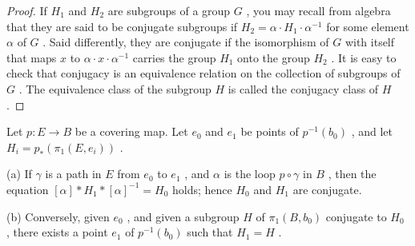 \begin{proof}
If \({H}_{1}\) and \({H}_{2}\) are subgroups of a group \(G\) , you may recall from algebra that they are said to be conjugate subgroups if \({H}_{2} = \alpha  \cdot  {H}_{1} \cdot  {\alpha }^{-1}\) for some element \(\alpha\) of \(G\) . Said differently, they are conjugate if the isomorphism of \(G\) with itself that maps \(x\) to \(\alpha  \cdot  x \cdot  {\alpha }^{-1}\) carries the group \({H}_{1}\) onto the group \({H}_{2}\) . It is easy to check that conjugacy is an equivalence relation on the collection of subgroups of \(G\) . The equivalence class of the subgroup \(H\) is called the conjugacy class of \(H\) .
\end{proof}
\begin{lemma} Let \(p : E \rightarrow  B\) be a covering map. Let \({e}_{0}\) and \({e}_{1}\) be points of \({p}^{-1}\left( {b}_{0}\right)\) , and let \({H}_{i} = {p}_{ * }\left( {{\pi }_{1}\left( {E,{e}_{i}}\right) }\right)\) .
\end{lemma}

(a) If \(\gamma\) is a path in \(E\) from \({e}_{0}\) to \({e}_{1}\) , and \(\alpha\) is the loop \(p \circ  \gamma\) in \(B\) , then the equation \(\left\lbrack  \alpha \right\rbrack * {H}_{1} * {\left\lbrack  \alpha \right\rbrack  }^{-1} = {H}_{0}\) holds; hence \({H}_{0}\) and \({H}_{1}\) are conjugate.

(b) Conversely, given \({e}_{0}\) , and given a subgroup \(H\) of \({\pi }_{1}\left( {B,{b}_{0}}\right)\) conjugate to \({H}_{0}\) , there exists a point \({e}_{1}\) of \({p}^{-1}\left( {b}_{0}\right)\) such that \({H}_{1} = H\) .


